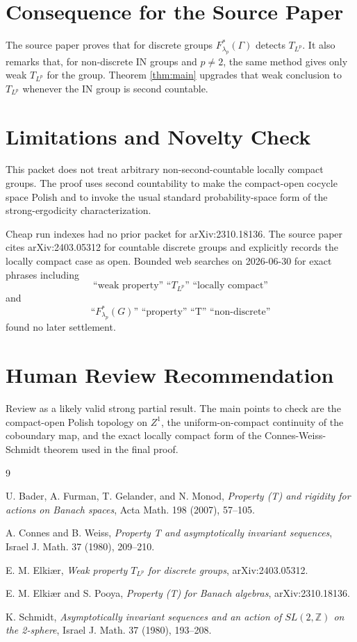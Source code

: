 \documentclass[11pt]{article}
\theoremstyle{definition}
\begin{document}
\section*{Consequence for the Source Paper}

The source paper proves that for discrete groups \(F^*_{\lambda_p}(\Gamma)\)
detects \(T_{L^p}\).  It also remarks that, for non-discrete IN groups and
\(p\ne2\), the same method gives only weak \(T_{L^p}\) for the group.  Theorem
\ref{thm:main} upgrades that weak conclusion to \(T_{L^p}\) whenever the IN
group is second countable.

\section*{Limitations and Novelty Check}

This packet does not treat arbitrary non-second-countable locally compact
groups.  The proof uses second countability to make the compact-open cocycle
space Polish and to invoke the usual standard probability-space form of the
strong-ergodicity characterization.

Cheap run indexes had no prior packet for arXiv:2310.18136.  The source paper
cites arXiv:2403.05312 \cite{ElkiaerWeak} for countable discrete groups and
explicitly records the locally compact case as open.  Bounded web searches on
2026-06-30 for exact phrases including
\[
\text{``weak property'' ``}T_{L^p}\text{'' ``locally compact''}
\]
and
\[
\text{``}F^*_{\lambda_p}(G)\text{'' ``property'' ``T'' ``non-discrete''}
\]
found no later settlement.

\section*{Human Review Recommendation}

Review as a likely valid strong partial result.  The main points to check are
the compact-open Polish topology on \(Z^1\), the uniform-on-compact continuity
of the coboundary map, and the exact locally compact form of the
Connes-Weiss-Schmidt theorem used in the final proof.

\begin{thebibliography}{9}

U. Bader, A. Furman, T. Gelander, and N. Monod,
\emph{Property (T) and rigidity for actions on Banach spaces},
Acta Math. 198 (2007), 57--105.

A. Connes and B. Weiss,
\emph{Property T and asymptotically invariant sequences},
Israel J. Math. 37 (1980), 209--210.

E. M. Elki\ae r,
\emph{Weak property \(T_{L^p}\) for discrete groups},
arXiv:2403.05312.

E. M. Elki\ae r and S. Pooya,
\emph{Property (T) for Banach algebras},
arXiv:2310.18136.

K. Schmidt,
\emph{Asymptotically invariant sequences and an action of \(SL(2,\mathbb Z)\)
on the 2-sphere},
Israel J. Math. 37 (1980), 193--208.

\end{thebibliography}
\end{document}
